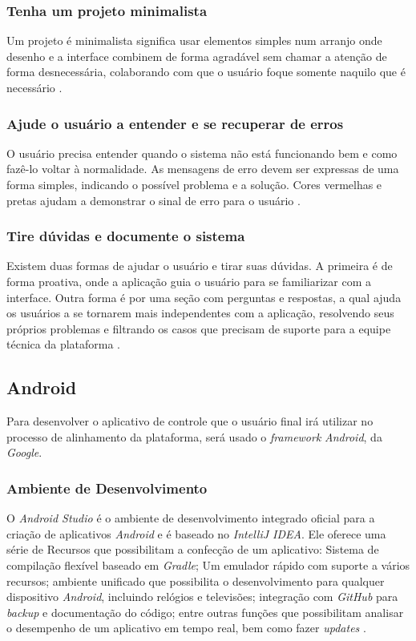 \subsubsection{Tenha um projeto minimalista}

Um projeto é minimalista significa usar elementos simples num arranjo onde desenho e a interface combinem de forma agradável sem chamar a atenção de forma desnecessária, colaborando com que o usuário foque somente naquilo que é necessário \cite{site:nielsen}.

\subsubsection{Ajude o usuário a entender e se recuperar de erros}

O usuário precisa entender quando o sistema não está funcionando bem e como fazê-lo voltar à normalidade. As mensagens de erro devem ser expressas de uma forma simples, indicando o possível problema e a solução. 
Cores vermelhas e pretas ajudam a demonstrar o sinal de erro para o usuário \cite{site:nielsenError}.

\subsubsection{Tire dúvidas e documente o sistema}

Existem duas formas de ajudar o usuário e tirar suas dúvidas. A primeira é de forma proativa, onde a aplicação guia o usuário para se familiarizar com a interface. Outra forma é por uma seção com perguntas e respostas, a qual ajuda os usuários a se tornarem mais independentes com a aplicação, resolvendo seus próprios problemas e filtrando os casos que precisam de suporte para a equipe técnica da plataforma \cite{site:nielsenHelpandDoc}.

\subsection{Android}
Para desenvolver o aplicativo de controle que o usuário final irá utilizar no processo de alinhamento da plataforma, será usado o \textit{framework} \textit{Android}, da \textit{Google}.

\subsubsection{Ambiente de Desenvolvimento}

O \textit{Android Studio} é o ambiente de desenvolvimento integrado oficial para a criação de aplicativos \textit{Android} e é baseado no \textit{IntelliJ IDEA}. Ele oferece uma série de Recursos que possibilitam a confecção de um aplicativo: Sistema de compilação flexível baseado em \textit{Gradle}; Um emulador rápido com suporte a vários recursos; ambiente unificado que possibilita o desenvolvimento para qualquer dispositivo \textit{Android}, incluindo relógios e televisões; integração com \textit{GitHub} para \textit{backup} e documentação do código; entre outras funções que possibilitam analisar o desempenho de um aplicativo em tempo real, bem como fazer \textit{updates} \cite{site:androidstudio}.

